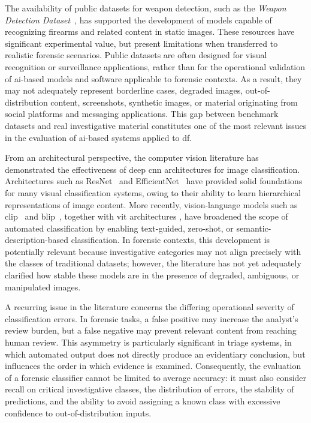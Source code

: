 The availability of public datasets for weapon detection, such as the
\textit{Weapon Detection Dataset}~\cite{Sanyal2023KaggleWeapon}, has supported
the development of models capable of recognizing firearms and related content
in static images. These resources have significant experimental value, but
present limitations when transferred to realistic forensic scenarios. Public
datasets are often designed for visual recognition or surveillance
applications, rather than for the operational validation of \gls{ai}-based
models and software applicable to forensic contexts. As a result, they may not
adequately represent borderline cases, degraded images, out-of-distribution
content, screenshots, synthetic images, or material originating from social
platforms and messaging applications. This gap between benchmark datasets and
real investigative material constitutes one of the most relevant issues in the
evaluation of \gls{ai}-based systems applied to \gls{df}.

From an architectural perspective, the computer vision literature has
demonstrated the effectiveness of deep \gls{cnn} architectures for image
classification. Architectures such as ResNet~\cite{he2016deep} and
EfficientNet~\cite{tan2019efficientnet} have provided solid foundations for
many visual classification systems, owing to their ability to learn
hierarchical representations of image content. More recently, vision-language
models such as \gls{clip}~\cite{radford2021learning} and
\gls{blip}~\cite{li2022blip}, together with \gls{vit} architectures
\cite{dosovitskiy2020image}, have broadened the scope of automated
classification by enabling text-guided, zero-shot, or
semantic-description-based classification. In forensic contexts, this
development is potentially relevant because investigative categories may not
align precisely with the classes of traditional datasets; however, the
literature has not yet adequately clarified how stable these models are in the
presence of degraded, ambiguous, or manipulated images.

A recurring issue in the literature concerns the differing operational severity
of classification errors. In forensic tasks, a false positive may increase the
analyst's review burden, but a false negative may prevent relevant content from
reaching human review. This asymmetry is particularly significant in triage
systems, in which automated output does not directly produce an evidentiary
conclusion, but influences the order in which evidence is examined.
Consequently, the evaluation of a forensic classifier cannot be limited to
average accuracy: it must also consider recall on critical investigative
classes, the distribution of errors, the stability of predictions, and the
ability to avoid assigning a known class with excessive confidence to
out-of-distribution inputs.

